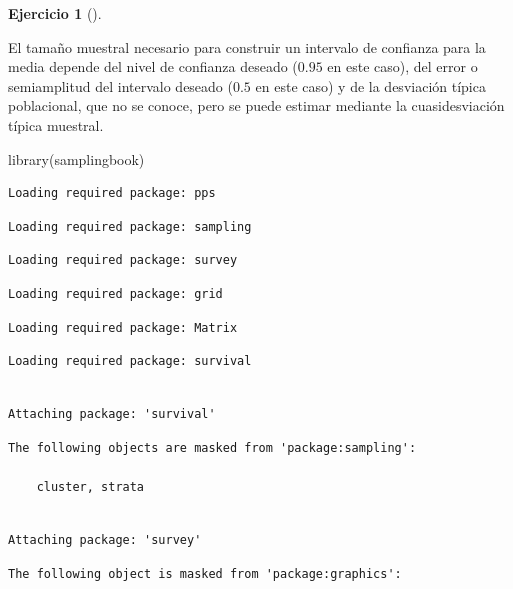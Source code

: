 \documentclass[
  a4paper,
]{scrreport}
\newenvironment{Shaded}{\begin{snugshade}}{\end{snugshade}}
\newcommand{\FunctionTok}[1]{\textcolor[rgb]{0.28,0.35,0.67}{#1}}
\newcommand{\NormalTok}[1]{\textcolor[rgb]{0.00,0.23,0.31}{#1}}
\theoremstyle{definition}
\newtheorem{exercise}{Ejercicio}[chapter]
\theoremstyle{remark}
\begin{document}
\begin{exercise}[]
\begin{enumerate}
\begin{tcolorbox}
  El tamaño muestral necesario para construir un intervalo de confianza
  para la media depende del nivel de confianza deseado (\(0.95\) en este
  caso), del error o semiamplitud del intervalo deseado (\(0.5\) en este
  caso) y de la desviación típica poblacional, que no se conoce, pero se
  puede estimar mediante la cuasidesviación típica muestral.

\begin{Shaded}
\begin{Highlighting}[]
\FunctionTok{library}\NormalTok{(samplingbook)}
\end{Highlighting}
\end{Shaded}

\begin{verbatim}
Loading required package: pps
\end{verbatim}

\begin{verbatim}
Loading required package: sampling
\end{verbatim}

\begin{verbatim}
Loading required package: survey
\end{verbatim}

\begin{verbatim}
Loading required package: grid
\end{verbatim}

\begin{verbatim}
Loading required package: Matrix
\end{verbatim}

\begin{verbatim}
Loading required package: survival
\end{verbatim}

\begin{verbatim}

Attaching package: 'survival'
\end{verbatim}

\begin{verbatim}
The following objects are masked from 'package:sampling':

    cluster, strata
\end{verbatim}

\begin{verbatim}

Attaching package: 'survey'
\end{verbatim}

\begin{verbatim}
The following object is masked from 'package:graphics':


\end{verbatim}
\end{tcolorbox}
\end{enumerate}
\end{exercise}
\end{document}
